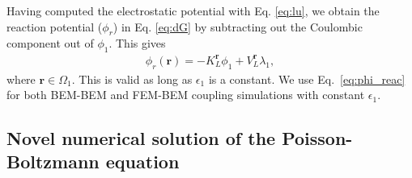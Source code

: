 %

Having computed the electrostatic potential with Eq. \eqref{eq:lu}, we obtain the reaction potential ($\phi_r$) in Eq. \eqref{eq:dG} by subtracting out the Coulombic component out of $\phi_1$. This gives\cite{CooperBardhanBarba2014}
%
\begin{align} \label{eq:phi_reac}
\phi_{r}(\mathbf{r}) = - K_{L}^{\mathbf{r}} \phi_1 + V_{L}^{\mathbf{r}}  \lambda_1  ,
\end{align}
%
where $\mathbf{r}\in\Omega_1$.
This is valid as long as $\epsilon_1$ is a constant. We use Eq.~\eqref{eq:phi_reac} for both BEM-BEM and FEM-BEM coupling simulations with constant $\epsilon_1$.



\subsection*{\sffamily \large Novel numerical solution of the Poisson-Boltzmann equation}


